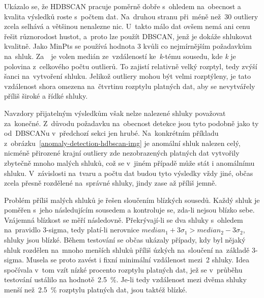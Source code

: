 Ukázalo se, že HDBSCAN pracuje poměrně dobře s~ohledem na~obecnost a kvalita výsledků roste s~počtem dat. Na~druhou stranu při~méně než~30 outliery zcela selhává a většinou nenalezne nic. U~takto málo dat ovšem nemá ani cenu řešit různorodost hustot, a~proto lze použít DBSCAN, jenž je dokáže shlukovat kvalitně. Jako MinPts se používá hodnota 3 kvůli co nejmírnějším požadavkům na~shluk. Za~\textepsilon~je volen medián ze~vzdáleností ke~\emph{k}-tému sousedu, kde \emph{k} je polovina z~celkového počtu outlierů. To zajistí relativně velký rozptyl, tedy zvýší šanci na~vytvoření shluku. Jelikož outliery mohou být velmi rozptýleny, je tato vzdálenost shora omezena na~čtvrtinu rozptylu platných dat, aby se nevytvářely příliš široké a řídké shluky.

Navzdory přijatelným výsledkům však nelze nalezené shluky považovat za~konečné. Z~důvodu požadavku na~obecnost detekce jsou tyto podobně jako ty od~DBSCANu v~předchozí sekci jen hrubé. Na~konkrétním příkladu z~obrázku~\ref{anomaly-detection-hdbscan-img} je anomální shluk nalezen celý, nicméně přirozené krajní outliery zde nezobrazených platných dat vytvořily zbytečně mnoho malých shluků, což se v~jiném případě může stát i anomálnímu shluku. V~závislosti na~tvaru a počtu dat budou tyto výsledky vždy jiné, občas zcela přesně rozdělené na~správné shluky, jindy zase až příliš jemně.

Problém příliš malých shluků je řešen sloučením blízkých sousedů. Každý shluk je poměřen s~jeho následujícím sousedem a kontroluje se, zda-li nejsou blízko sebe. Vzájemná blízkost se měří následovně. Překrývají-li se dva shluky s~ohledem na~pravidlo 3-sigma, tedy platí-li nerovnice \(median_1 + 3\sigma_1 > median_2 - 3\sigma_2\), shluky jsou blízké. Během testování se občas ukázaly případy, kdy byl nějaký shluk rozdělen na~mnoho menších shluků příliš úzkých na~sloučení na~základě 3-sigma. Musela se proto zavést i fixní minimální vzdálenost mezi~2 shluky. Idea spočívala v~tom vzít nízké procento rozptylu platných dat, jež se v~průběhu testování ustálilo na hodnotě~2.5~\%. Je-li tedy vzdálenost mezi dvěma shluky menší než~2.5~\% rozptylu platných dat, jsou taktéž blízké.

